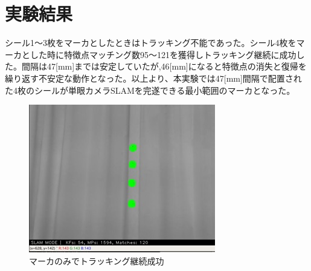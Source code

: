 \newpage

\section{実験結果}

シール1〜3枚をマーカとしたときはトラッキング不能であった。シール4枚をマーカとした時に特徴点マッチング数95〜121を獲得しトラッキング継続に成功した。間隔は47[mm]までは安定していたが,46[mm]になると特徴点の消失と復帰を繰り返す不安定な動作となった。以上より、本実験では47[mm]間隔で配置された4枚のシールが単眼カメラSLAMを完遂できる最小範囲のマーカとなった。

\begin{figure}[h]
        \begin{center}
        \includegraphics[width=0.7\linewidth]{figs/Tracking03.jpg}
        \caption{マーカのみでトラッキング継続成功}
        \label{fig:Tracking03}
        \end{center}
\end{figure}

